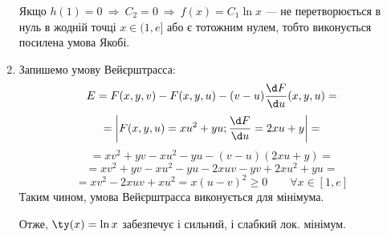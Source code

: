 \begin{example}
\begin{enumerate}
\[\]
Якщо \( h(1) = 0 \  \Longrightarrow \  C_2 = 0 \  \Longrightarrow \  f(x) = C_1 \ln x \) --- не перетворюється в нуль в жодній точці \( x \in (1,e] \) або є тотожним нулем, тобто виконується посилена умова Якобі.
\item Запишемо умову Вейєрштрасса:
\[
 E = F(x,y,v) - F(x,y,u) - (v-u) \frac{\d F}{\d u} (x,y,u)  =
\]
\[
= \left| F(x,y,u) = xu^2 + yu ; \frac{\d F}{\d u} = 2xu + y \right| =
\]
\[
 = xv^2 + yv - xu^2 - yu - (v-u)(2xu + y) =
\]
\[
= xv^2 + yv - xu^2 - yu - 2xuv - yv + 2xu^2 + yu =
\]
\[
 = xv^2 - 2xuv  + xu^2 = x(u-v)^2 \geq 0 \qquad \forall x \in [1, e]
\]
Таким чином, умова Вейєрштрасса виконується для мінімума.\par
Отже, \( \ty (x) = \ln x \) забезпечує і сильний, і слабкий лок. мінімум.
\end{enumerate}
\end{example}
